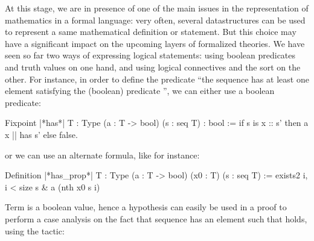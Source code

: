 




At this stage, we are in presence of one of the main issues in the
representation of mathematics in a formal language: very often,
several datastructures can be used to represent a same mathematical
definition or statement. But this choice may have a significant impact
on the upcoming layers of formalized theories. We have seen so far two
ways of expressing logical statements: using boolean predicates and
truth values on one hand, and using logical connectives and the
 sort on the other. For instance, in order to define the
predicate ``the sequence  has at least one element satisfying the
(boolean) predicate '', we can either use a boolean predicate:

\begin{coq}{}{}
Fixpoint |*has*| {T : Type} (a : T -> bool) (s : seq T) : bool :=
  if s is x :: s' then a x || has s' else false.
\end{coq}

or we can use an alternate formula, like for instance:

\begin{coq}{}{}
Definition |*has_prop*|  {T : Type} (a : T -> bool) (x0 : T) (s : seq T) :=
   exists2 i, i < size s & a (nth x0 s i)
\end{coq}

Term  is a boolean value, hence a hypothesis
 can easily be used in a proof to perform a case
analysis on the fact that sequence
 has an element such that  holds, using the  tactic:

